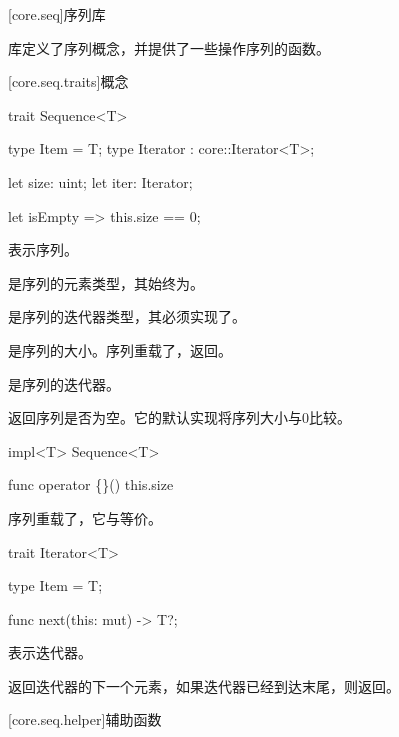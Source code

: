 
[core.seq]{序列库}

\pnum
{}库定义了序列概念，并提供了一些操作序列的函数。

[core.seq.traits]{概念}

\begin{itemdecl}
trait Sequence<T> {
    type Item = T;
    type Iterator : core::Iterator<T>;

    let size: uint;
    let iter: Iterator;

    let isEmpty => this.size == 0;
}
\end{itemdecl}

\pnum
{}表示序列。

\pnum
{}是序列的元素类型，其始终为。

\pnum
{}是序列的迭代器类型，其必须实现了。

\pnum
{}是序列的大小。序列重载了，返回。

\pnum
{}是序列的迭代器。

\pnum
{}返回序列是否为空。它的默认实现将序列大小与0比较。

\begin{itemdecl}
impl<T> Sequence<T> {
    func operator \{\dollar\}() { this.size }


}
\end{itemdecl}

\pnum
序列重载了，它与等价。


\begin{itemdecl}
trait Iterator<T> {
    type Item = T;

    func next(this: mut) -> T?;
}
\end{itemdecl}

\pnum
{}表示迭代器。

\pnum
{}返回迭代器的下一个元素，如果迭代器已经到达末尾，则返回。

[core.seq.helper]{辅助函数}

